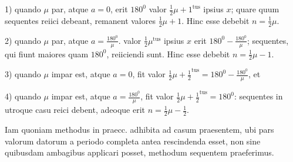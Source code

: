 1) quando $\mu$ par, atque $a=0$, erit $180^{\mathord{0}}$ valor $\frac12\mu+1^{\mathrm{tus}}$ ipsius $x$; quare quum sequentes reiici debeant, remanent valores $\frac12\mu+1$. Hinc esse debebit $n=\frac12\mu$.

2) quando $\mu$ par, atque $a=\frac{180^{\mathord{0}}}{\mu}$. valor $\frac12\mu^{\mathrm{tus}}$ ipsius $x$ erit $180^{\mathord{0}}-\frac{180^{\mathord{0}}}{\mu}$; sequentes, qui fiunt maiores quam $180^{\mathord{0}}$, reiiciendi sunt. Hinc esse debebit $n=\frac12\mu-1$.

3) quando $\mu$ impar est, atque $a=0$, fit valor $\frac12\mu+\frac12^{\mathrm{tus}}=180^{\mathord{0}}-\frac{180^{\mathord{0}}}{\mu}$, et

4) quando $\mu$ impar est, atque $a=\frac{180^{\mathord{0}}}{\mu}$, fit valor $\frac12\mu+\frac12^{\mathrm{tus}}=180^{\mathord{0}}$: sequentes in utroque casu reici debent, adeoque erit $n=\frac12\mu-\frac12$.

Iam quoniam methodus in praecc. adhibita ad casum praesentem, ubi pars valorum datorum a periodo completa antea rescindenda esset, non sine quibusdam ambagibus applicari posset, methodum sequentem praeferimus.

